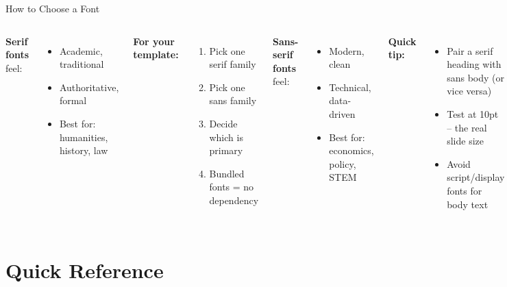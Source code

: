 \documentclass[10pt]{beamer}
\begin{document}
\begin{frame}{How to Choose a Font}
  \begin{columns}[T]
    \textbf{Serif fonts} feel:
    \begin{itemize}
      \item Academic, traditional
      \item Authoritative, formal
      \item Best for: humanities, history, law
    \end{itemize}

    \vspace{0.5cm}
    \textbf{For your template:}
    \begin{enumerate}
      \item Pick one serif family
      \item Pick one sans family
      \item Decide which is primary
      \item Bundled fonts = no dependency
    \end{enumerate}

    \textbf{Sans-serif fonts} feel:
    \begin{itemize}
      \item Modern, clean
      \item Technical, data-driven
      \item Best for: economics, policy, STEM
    \end{itemize}

    \vspace{0.5cm}
    \textbf{Quick tip:}
    \begin{itemize}
      \item Pair a serif heading with sans body (or vice versa)
      \item Test at 10pt -- the real slide size
      \item Avoid script/display fonts for body text
    \end{itemize}
  \end{columns}
\end{frame}

\section{Quick Reference}
\end{document}
